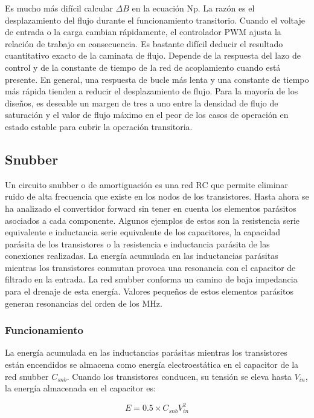 Es mucho más difícil calcular $\Delta B$ en la ecuación Np. 
La razón es el desplazamiento del flujo durante el funcionamiento transitorio. 
Cuando el voltaje de entrada o la carga cambian rápidamente, el controlador PWM ajusta la relación de trabajo en consecuencia. 
Es bastante difícil deducir el resultado cuantitativo exacto de la caminata de flujo. 
Depende de la respuesta del lazo de control y de la constante de tiempo de la red de acoplamiento cuando está presente. 
En general, una respuesta de bucle más lenta y una constante de tiempo más rápida tienden a reducir el desplazamiento de flujo. 
Para la mayoría de los diseños, es deseable un margen de tres a uno entre la densidad de flujo de saturación 
y el valor de flujo máximo en el peor de los casos de operación en estado estable para cubrir la operación transitoria.

\subsection{Snubber}

Un circuito snubber o de amortiguación es una red RC que permite eliminar ruido de alta frecuencia que existe en los nodos de los transistores.
Hasta ahora se ha analizado el convertidor forward sin tener en cuenta los elementos parásitos asociados a cada componente. 
Algunos ejemplos de estos son la resistencia serie equivalente e inductancia serie equivalente de los capacitores, 
la capacidad parásita de los transistores o la resistencia e inductancia parásita de las conexiones realizadas. 
La energía acumulada en las inductancias parásitas mientras los transistores conmutan provoca una resonancia con el capacitor de filtrado en la entrada. 
La red snubber conforma un camino de baja impedancia para el drenaje de esta energía. 
Valores pequeños de estos elementos parásitos generan resonancias del orden de los MHz. 

\subsubsection{Funcionamiento}

La energía acumulada en las inductancias parásitas mientras los transistores están encendidos se almacena como energía electroestática en el capacitor de la red snubber $C_{snb}$. 
Cuando los transistores conducen, su tensión se eleva hasta $V_{in}$, la energía almacenada en el capacitor es: 

$$ E=0.5\times C_{snb}V_{in}^{2} $$

